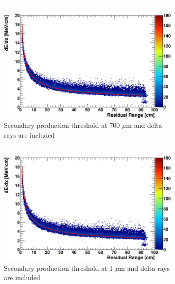 \begin{figure}[tbp!]
        \begin{subfigure}[b]{0.495\textwidth}   
            \centering 
            \includegraphics[width=\textwidth]{derr_proton_delta_700um}
            \caption{Secondary production threshold at 700 $\mu$m and delta rays are included}%
            \label{fig:derr_proton_delta_700}
        \end{subfigure}
        \hfill
        \begin{subfigure}[b]{0.495\textwidth}   
            \centering 
            \includegraphics[width=\textwidth]{derr_proton_delta_1um}
            \caption{Secondary production threshold at 1 $\mu$m and delta rays are included}%
            \label{fig:derr_proton_delta_1}
        \end{subfigure}
        \begin{subfigure}[b]{0.495\textwidth}   

\end{subfigure}
\end{figure}

